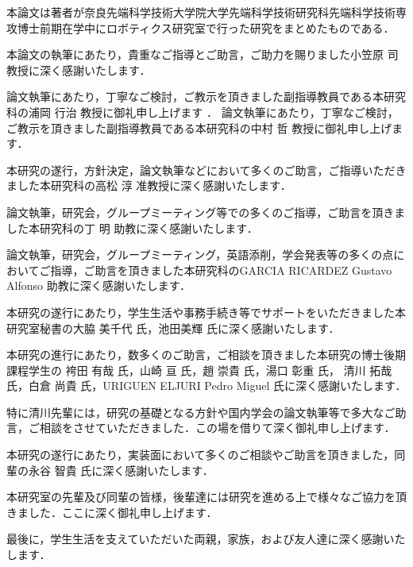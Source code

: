 \acknowledgements
本論文は著者が奈良先端科学技術大学院大学先端科学技術研究科先端科学技術専攻博士前期在学中にロボティクス研究室で行った研究をまとめたものである．

本論文の執筆にあたり，貴重なご指導とご助言，ご助力を賜りました小笠原 司 教授に深く感謝いたします．

論文執筆にあたり，丁寧なご検討，ご教示を頂きました副指導教員である本研究科の浦岡 行治 教授に御礼申し上げます
．
論文執筆にあたり，丁寧なご検討，ご教示を頂きました副指導教員である本研究科の中村 哲 教授に御礼申し上げます．

本研究の遂行，方針決定，論文執筆などにおいて多くのご助言，ご指導いただきました本研究科の高松 淳 准教授に深く感謝いたします．

論文執筆，研究会，グループミーティング等での多くのご指導，ご助言を頂きました本研究科の丁 明 助教に深く感謝いたします．

論文執筆，研究会，グループミーティング，英語添削，学会発表等の多くの点においてご指導，ご助言を頂きました本研究科のGARCIA RICARDEZ Gustavo Alfonso 助教に深く感謝いたします．

本研究の遂行にあたり，学生生活や事務手続き等でサポートをいただきました本研究室秘書の大脇 美千代 氏，池田美輝 氏に深く感謝いたします．

本研究の進行にあたり，数多くのご助言，ご相談を頂きました本研究の博士後期課程学生の	
袴田 有哉 氏，山崎 亘 氏，趙 崇貴 氏，湯口 彰重 氏， 清川 拓哉 氏，白倉 尚貴 氏，URIGUEN ELJURI Pedro Miguel   氏に深く感謝いたします．

特に清川先輩には，研究の基礎となる方針や国内学会の論文執筆等で多大なご助言，ご相談をさせていただきました．この場を借りて深く御礼申し上げます．

本研究の遂行にあたり，実装面において多くのご相談やご助言を頂きました，同輩の永谷 智貴 氏に深く感謝いたします．

本研究室の先輩及び同輩の皆様，後輩達には研究を進める上で様々なご協力を頂きました．ここに深く御礼申し上げます．

最後に，学生生活を支えていただいた両親，家族，および友人達に深く感謝いたします．



\newpage
